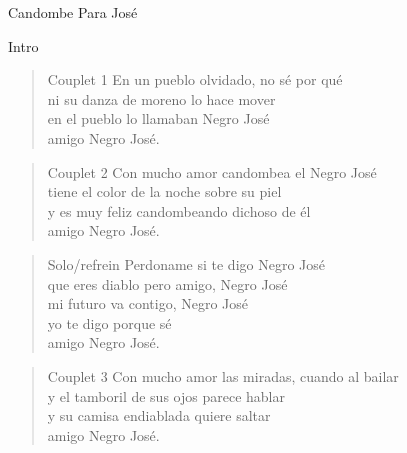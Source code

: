 \begin{song}[candombe]{Candombe Para José}
\begin{instrumental}{Intro}
\measure{}\measure{}\measure{}\measure{}\measure{}\measure{}
\end{instrumental}

\begin{verse}{Couplet 1}
En un pueblo olvidado, no sé por qué\\
ni su danza de moreno lo hace mover\\
en el pueblo lo llamaban Negro José\\
amigo Negro José. \\
\end{verse}

\begin{verse}{Couplet 2}
Con mucho amor candombea el Negro José\\
tiene el color de la noche sobre su piel\\
y es muy feliz candombeando dichoso de él\\
amigo Negro José. \\
\end{verse}

\begin{verse}{Solo/refrein}
Perdoname si te digo Negro José\\
que eres diablo pero amigo, Negro José\\
mi futuro va contigo, Negro José\\
yo te digo porque sé  \\
amigo Negro José. \\
\end{verse}


\begin{verse}{Couplet 3}
Con mucho amor las miradas, cuando al bailar\\
y el tamboril de sus ojos parece hablar\\
y su camisa endiablada quiere saltar\\
amigo Negro José. \\
\end{verse}


\end{song}
